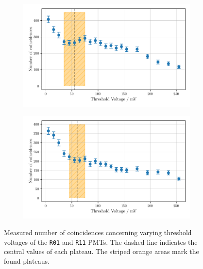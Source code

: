 \begin{figure}
    \begin{subfigure}[b]{0.48\textwidth}
        \includegraphics[width=\textwidth]{plots/threshR01.pdf}
    \end{subfigure}\hfill
    \begin{subfigure}[b]{0.48\textwidth}
        \includegraphics[width=\textwidth]{plots/threshR11.pdf}
    \end{subfigure}
    \caption{Measured number of coincidences concerning varying threshold voltages
    of the \texttt{R01} and \texttt{R11} PMTs.
    The dashed line indicates the central values of each plateau. The striped orange areas mark the found plateaus.}
    \label{fig:appthresh2}
\end{figure}   
